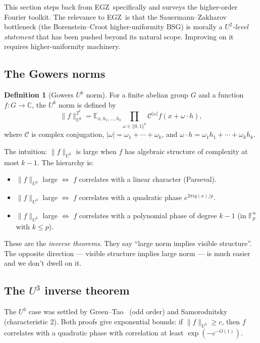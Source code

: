 \documentclass[11pt,a4paper]{article}
\theoremstyle{plain}
\theoremstyle{definition}
\newtheorem{definition}[theorem]{Definition}
\theoremstyle{remark}
\newcommand{\F}{\mathbb{F}}
\newcommand{\C}{\mathbb{C}}
\newcommand{\E}{\mathbb{E}}
\newcommand{\EGZ}{\textsf{EGZ}}
\begin{document}
This section steps back from \EGZ\ specifically and surveys the higher-order Fourier toolkit. The relevance to \EGZ\ is that the Sauermann--Zakharov bottleneck (the Borenstein--Croot higher-uniformity BSG) is morally a \emph{$U^2$-level statement} that has been pushed beyond its natural scope. Improving on it requires higher-uniformity machinery.

\subsection{The Gowers norms}

\begin{definition}[Gowers $U^k$ norm]
For a finite abelian group $G$ and a function $f: G \to \C$, the $U^k$ norm is defined by
\[
\|f\|_{U^k}^{2^k} = \E_{x, h_1, \ldots, h_k} \prod_{\omega \in \{0,1\}^k} \mathcal{C}^{|\omega|} f(x + \omega \cdot h),
\]
where $\mathcal{C}$ is complex conjugation, $|\omega| = \omega_1 + \cdots + \omega_k$, and $\omega \cdot h = \omega_1 h_1 + \cdots + \omega_k h_k$.
\end{definition}

The intuition: $\|f\|_{U^k}$ is large when $f$ has algebraic structure of complexity at most $k - 1$. The hierarchy is:
\begin{itemize}[leftmargin=2em]
  \item $\|f\|_{U^2}$ large $\iff$ $f$ correlates with a linear character (Parseval).
  \item $\|f\|_{U^3}$ large $\iff$ $f$ correlates with a quadratic phase $e^{2\pi i q(x)/p}$.
  \item $\|f\|_{U^k}$ large $\iff$ $f$ correlates with a polynomial phase of degree $k - 1$ (in $\F_p^n$ with $k \leq p$).
\end{itemize}

These are the \emph{inverse theorems}. They say ``large norm implies visible structure''. The opposite direction --- visible structure implies large norm --- is much easier and we don't dwell on it.

\subsection{The $U^3$ inverse theorem}

The $U^3$ case was settled by Green--Tao~\cite{greentao2008} (odd order) and Samorodnitsky~\cite{samorodnitsky2007} (characteristic 2). Both proofs give exponential bounds: if $\|f\|_{U^3} \geq c$, then $f$ correlates with a quadratic phase with correlation at least $\exp(-c^{-O(1)})$.
\end{document}
